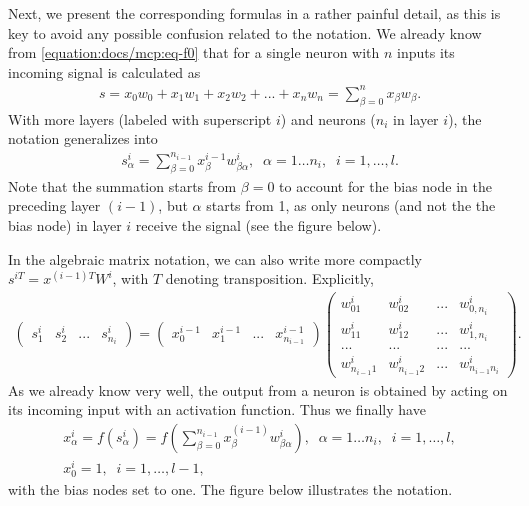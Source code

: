 \documentclass[letterpaper,10pt,english]{jupyterBook}
\begin{document}
\sphinxAtStartPar
Next, we present the corresponding formulas in a rather painful detail, as this is key to avoid any possible confusion related to the notation.
We already know from \eqref{equation:docs/mcp:eq-f0} that for a single neuron with \(n\) inputs its incoming signal is calculated as
\begin{equation*}
\begin{split}s = x_0 w_0 + x_1 w_1 + x_2 w_2 + ... + x_n w_n = \sum_{\beta=0}^n x_\beta w_\beta .\end{split}
\end{equation*}
\sphinxAtStartPar
With more layers (labeled with superscript \(i\)) and neurons (\(n_i\) in layer \(i\)),
the notation generalizes into
\begin{equation*}
\begin{split}
s^i_\alpha=\sum_{\beta=0}^{n_{i-1}} x^{i-1}_\beta w^i_{\beta \alpha}, \;\; \alpha=1\dots n_i, \;\; i=1,\dots,l.
\end{split}
\end{equation*}
\sphinxAtStartPar
Note that the summation starts from \(\beta=0\) to account for the bias node in the preceding layer \((i-1)\), but \(\alpha\) starts from 1, as only neurons (and not the the bias node) in layer \(i\) receive the signal (see the figure below).

\sphinxAtStartPar
In the algebraic matrix notation, we can also write more compactly
\(s^{iT} = x^{(i-1)T} W^i\), with \(T\) denoting transposition. Explicitly,
\begin{equation*}
\begin{split}
\begin{pmatrix} s^i_1 & s^i_2 & ...& s^i_{n_i} \end{pmatrix} = 
\begin{pmatrix} x^{i-1}_0 & x^{i-1}_1 & ...& x^{i-1}_{n_{i-1}} \end{pmatrix}
\begin{pmatrix} w^i_{01} & w^i_{02} & ...& w^i_{0,n_i} \\ w^i_{11} & w^i_{12} & ...& w^i_{1,n_i} \\ 
 ... & ... & ...& ... \\ w^i_{n_{i-1}1} & w^i_{n_{i-1}2} & ...& w^i_{n_{i-1}n_i} \end{pmatrix}.
\end{split}
\end{equation*}
\sphinxAtStartPar
As we already know very well, the output from a neuron is obtained by acting on its incoming input with an activation function. Thus we finally have
\begin{equation*}
\begin{split} 
x^i_\alpha  = f(s^i_\alpha) = f \left (\sum_{\beta=0}^{n_{i-1}} x^{(i-1)}_\beta w^i_{\beta \alpha} \right), \;\; \alpha=1\dots n_i, \;\; i=1,\dots,l , \\
x^i_0 =1, \;\; i=1,\dots,l-1,  
\end{split}
\end{equation*}
\sphinxAtStartPar
with the bias nodes set to one.
The figure below illustrates the notation.
\end{document}

